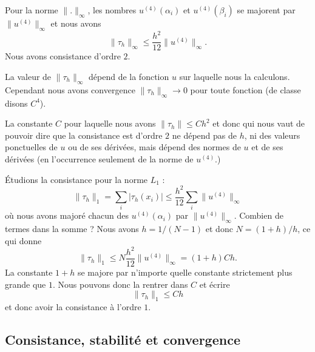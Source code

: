 Pour la norme \(  \| . \|_{\infty}\), les nombres \( u^{(4)}(\alpha_i)\) et \( u^{(4)}(\beta_i)\) se majorent par \(  \| u^{(4)} \|_{\infty}\) et nous avons
\begin{equation}
    \| \tau_h \|_{\infty}\leq \frac{ h^2 }{ 12 }\| u^{(4)} \|_{\infty}.
\end{equation}
Nous avons consistance d'ordre \( 2\).

\begin{remark}
    La valeur de \( \| \tau_h \|_{\infty}\) dépend de la fonction \( u\) sur laquelle nous la calculons. Cependant nous avons convergence \( \| \tau_h \|_{\infty}\to 0\) pour toute fonction (de classe disons \( C^4\)).

    La constante \( C\) pour laquelle nous avons \( \| \tau_h \|\leq Ch^2\) et donc qui nous vaut de pouvoir dire que la consistance est d'ordre \( 2\) ne dépend pas de \( h\), ni des valeurs ponctuelles de \( u\) ou de ses dérivées, mais dépend des normes de \( u\) et de ses dérivées (en l'occurrence seulement de la norme de \( u^{(4)}\).)
\end{remark}

Étudions la consistance pour la norme \( L_1\) :
\begin{equation}
    \| \tau_h \|_1=\sum_i| \tau_h(x_i) |\leq \frac{ h^2 }{ 12 }\sum_i\| u^{(4)} \|_{\infty}
\end{equation}
où nous avons majoré chacun des \( u^{(4)}(\alpha_i)\) par \( \| u^{(4)} \|_{\infty}\). Combien de termes dans la somme ? Nous avons \( h=1/(N-1)\) et donc \( N=(1+h)/h\), ce qui donne
\begin{equation}
    \| \tau_h \|_1\leq N\frac{ h^2 }{ 12 }\| u^{(4)} \|_{\infty}=(1+h)Ch.
\end{equation}
La constante \( 1+h\) se majore par n'importe quelle constante strictement plus grande que \( 1\). Nous pouvons donc la rentrer dans \( C\) et écrire 
\begin{equation}
    \| \tau_h \|_1\leq Ch
\end{equation}
et donc avoir la consistance à l'ordre \( 1\).

\subsection{Consistance, stabilité et convergence}

